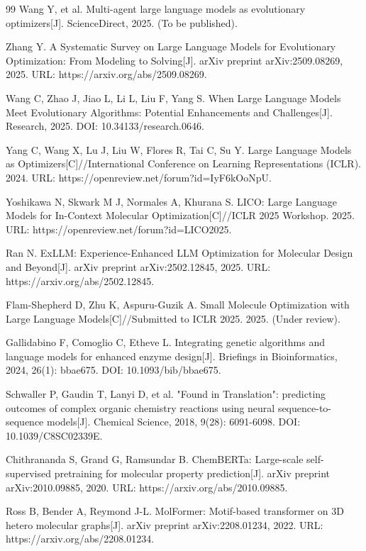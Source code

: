 \begin{thebibliography}{99}
Wang Y, et al. Multi-agent large language models as evolutionary optimizers[J]. ScienceDirect, 2025. (To be published).

Zhang Y. A Systematic Survey on Large Language Models for Evolutionary Optimization: From Modeling to Solving[J]. arXiv preprint arXiv:2509.08269, 2025. URL: https://arxiv.org/abs/2509.08269.

Wang C, Zhao J, Jiao L, Li L, Liu F, Yang S. When Large Language Models Meet Evolutionary Algorithms: Potential Enhancements and Challenges[J]. Research, 2025. DOI: 10.34133/research.0646.

Yang C, Wang X, Lu J, Liu W, Flores R, Tai C, Su Y. Large Language Models as Optimizers[C]//International Conference on Learning Representations (ICLR). 2024. URL: https://openreview.net/forum?id=IyF6kOoNpU.

Yoshikawa N, Skwark M J, Normales A, Khurana S. LICO: Large Language Models for In-Context Molecular Optimization[C]//ICLR 2025 Workshop. 2025. URL: https://openreview.net/forum?id=LICO2025.

Ran N. ExLLM: Experience-Enhanced LLM Optimization for Molecular Design and Beyond[J]. arXiv preprint arXiv:2502.12845, 2025. URL: https://arxiv.org/abs/2502.12845.

Flam-Shepherd D, Zhu K, Aspuru-Guzik A. Small Molecule Optimization with Large Language Models[C]//Submitted to ICLR 2025. 2025. (Under review).

Gallidabino F, Comoglio C, Etheve L. Integrating genetic algorithms and language models for enhanced enzyme design[J]. Briefings in Bioinformatics, 2024, 26(1): bbae675. DOI: 10.1093/bib/bbae675.

Schwaller P, Gaudin T, Lanyi D, et al. "Found in Translation": predicting outcomes of complex organic chemistry reactions using neural sequence-to-sequence models[J]. Chemical Science, 2018, 9(28): 6091-6098. DOI: 10.1039/C8SC02339E.

Chithrananda S, Grand G, Ramsundar B. ChemBERTa: Large-scale self-supervised pretraining for molecular property prediction[J]. arXiv preprint arXiv:2010.09885, 2020. URL: https://arxiv.org/abs/2010.09885.

Ross B, Bender A, Reymond J-L. MolFormer: Motif-based transformer on 3D hetero molecular graphs[J]. arXiv preprint arXiv:2208.01234, 2022. URL: https://arxiv.org/abs/2208.01234.


\end{thebibliography}
